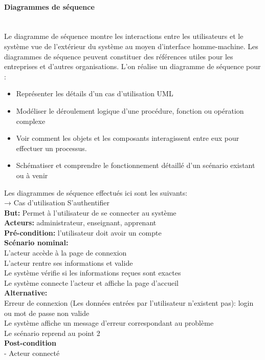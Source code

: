 \paragraph{Diagrammes de séquence} ~~\\
	Le diagramme de séquence montre les interactions entre les utilisateurs et le système vue de l’extérieur du système au moyen d’interface homme-machine. 
Les diagrammes de séquence peuvent constituer des références utiles pour les entreprises et d'autres organisations. L’on réalise un diagramme de séquence pour :
\begin{itemize}
	\item Représenter les détails d'un cas d'utilisation UML
	\item Modéliser le déroulement logique d'une procédure, fonction ou opération complexe
	\item Voir comment les objets et les composants interagissent entre eux pour effectuer un processus.
	\item Schématiser et comprendre le fonctionnement détaillé d'un scénario existant ou à venir
\end{itemize}

Les diagrammes de séquence effectués ici sont les suivants: \\
→ Cas d’utilisation S’authentifier \\
\textbf{But:} Permet à l’utilisateur de se connecter au système \\
\textbf{Acteurs:} administrateur, enseignant, apprenant \\
\textbf{Pré-condition:} l’utilisateur doit avoir un compte \\
\textbf{Scénario nominal:}  \\
L’acteur accède à la page de connexion \\
L’acteur rentre ses informations et valide \\
Le système vérifie si les informations reçues sont exactes \\
Le système connecte l’acteur et affiche la page d’accueil \\
\textbf{Alternative:}  \\
        Erreur de connexion (Les données entrées par l’utilisateur n’existent pas): login ou mot de passe non valide \\
Le système affiche un message d’erreur correspondant au problème \\
	        Le scénario reprend au point 2 \\
\textbf{Post-condition} \\
 - Acteur connecté 
 
